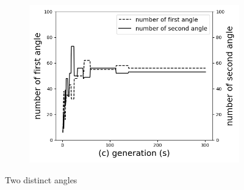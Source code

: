 \begin{figure}[!htb]
		\begin{subfigure}[b]{0.8\linewidth}
			\includegraphics[width=\linewidth]{Figures/chapter4_second_two_distinct_angler_number_change.png}
		\end{subfigure}
	\caption{Two distinct angles}
	\label{fig:two_angles}
\end{figure}



